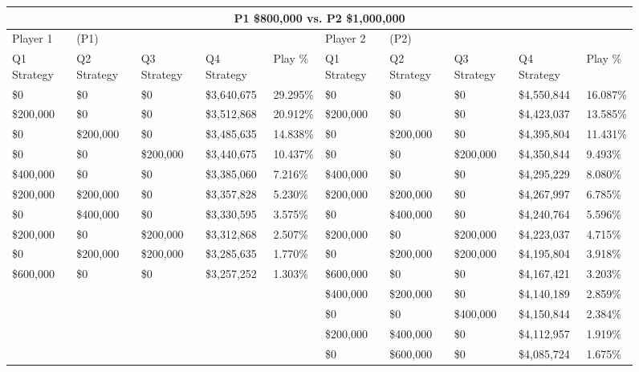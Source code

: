 \documentclass[11pt]{article}
\begin{document}
\begin{figure}
\tiny
\begin{tabular}{ |p{1.0cm}p{1.0cm}p{1.0cm}p{2.0cm}|p{1.0cm}||p{1.0cm}p{1.0cm}p{1.0cm}p{2.0cm}|p{1.0cm}|}
\hline
\multicolumn{10}{|c|}{P1 \$800,000 vs. P2 \$1,000,000} \\
\hline
Player 1 & (P1) & & & & Player 2 & (P2) & & & \\
\hline
Q1 Strategy & Q2 Strategy & Q3 Strategy & Q4 Strategy  &  Play \% & Q1 Strategy & Q2 Strategy & Q3 Strategy & Q4 Strategy  &  Play \%\\
\hline
\$0 & \$0 & \$0 & \$3,640,675  & 29.295\%           & \$0 & \$0 & \$0 & \$4,550,844  & 16.087\% \\
\$200,000 & \$0 & \$0 & \$3,512,868  & 20.912\%     & \$200,000 & \$0 & \$0 & \$4,423,037  & 13.585\% \\
\$0& \$200,000 & \$0 & \$3,485,635  & 14.838\%      & \$0& \$200,000 & \$0 & \$4,395,804  & 11.431\% \\
\$0 & \$0& \$200,000 & \$3,440,675  & 10.437\%      & \$0 & \$0& \$200,000 & \$4,350,844  & 9.493\% \\
\$400,000 & \$0 & \$0 & \$3,385,060  & 7.216\%      & \$400,000 & \$0 & \$0 & \$4,295,229  & 8.080\% \\
\$200,000& \$200,000 & \$0 & \$3,357,828  & 5.230\% & \$200,000& \$200,000 & \$0 & \$4,267,997  & 6.785\% \\
\$0& \$400,000 & \$0 & \$3,330,595  & 3.575\%       & \$0& \$400,000 & \$0 & \$4,240,764  & 5.596\% \\
\$200,000 & \$0& \$200,000 & \$3,312,868  & 2.507\% & \$200,000 & \$0& \$200,000 & \$4,223,037  & 4.715\% \\
\$0& \$200,000& \$200,000 & \$3,285,635  & 1.770\%  & \$0& \$200,000& \$200,000 & \$4,195,804  & 3.918\% \\
\$600,000 & \$0 & \$0 & \$3,257,252  & 1.303\%       & \$600,000 & \$0 & \$0 & \$4,167,421  & 3.203\% \\
&&&&                                                & \$400,000& \$200,000 & \$0 & \$4,140,189  & 2.859\% \\
&&&&                                                & \$0 & \$0& \$400,000 & \$4,150,844  & 2.384\% \\
&&&&                                                & \$200,000& \$400,000 & \$0 & \$4,112,957  & 1.919\% \\
&&&&                                                & \$0 & \$600,000 & \$0 & \$4,085,724  & 1.675\% \\

\end{tabular}
\end{figure}
\end{document}
